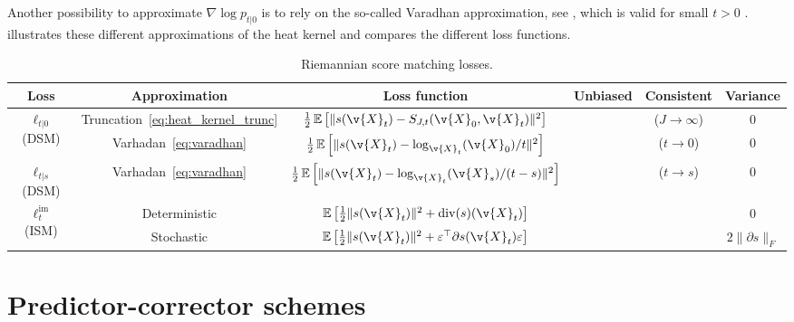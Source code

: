 Another possibility to approximate $\nabla \log p_{t|0}$ is to rely on the so-called Varadhan approximation, see , which is valid for small $t >0$ .
 illustrates these different
approximations of the heat kernel and  compares the
different loss functions.

\begin{table}[ht]
	\centering
	\small
	\setlength{\tabcolsep}{0.3em}
	\renewcommand*{\arraystretch}{1.4}
	\begin{tabular}{cc|c|ccc}
		Loss & Approximation & Loss function & Unbiased & Consistent & Variance \\ \midrule \multirow{2}{4.5em}{$\ell_{t|0}$ (DSM)} & Truncation~\eqref{eq:heat_kernel_trunc} & $\frac{1}{2} \E \left[ \| s(\v{X}_t) - S_{J,t}(\v{X}_0,\v{X}_t) \|^2 \right]$ & \xmark & \cmark ($J \rightarrow \infty$) & 0 \\ & Varhadan~\eqref{eq:varadhan} & $\frac{1}{2} \E \left[ \| s(\v{X}_t) - \log_{\v{X}_t}(\v{X}_0) / t \|^2 \right]$ & \xmark & \cmark ($t \rightarrow 0$) & 0 \\ \midrule $\ell_{t|s}$ (DSM) & Varhadan~\eqref{eq:varadhan} & $\frac{1}{2} \E \left[ \| s(\v{X}_t) - \log_{\v{X}_t}(\v{X}_s) / (t-s) \|^2 \right]$ & \xmark & \cmark($t \rightarrow s$) & 0 \\ \midrule \multirow{2}{4.5em}{$\ell^{\mathrm{im}}_t$ (ISM)} & Deterministic & $\E \left[\frac{1}{2} \| s(\v{X}_t) \|^2 + \mathrm{div}( s)(\v{X}_t) \right]$ & \cmark & \cmark & 0 \\ & Stochastic & $\E \left[\frac{1}{2} \| s(\v{X}_t) \|^2 + \varepsilon^\top \partial s(\v{X}_t) \varepsilon \right]$ & \cmark & \cmark & $2 \| \partial s \|_F$\\ \bottomrule\end{tabular} \caption{\small Riemannian score matching losses.
	}
	\label{tab:sm_losses_bis}
\end{table}

\section{Predictor-corrector schemes}
\label{sec:predictor-corrector}

